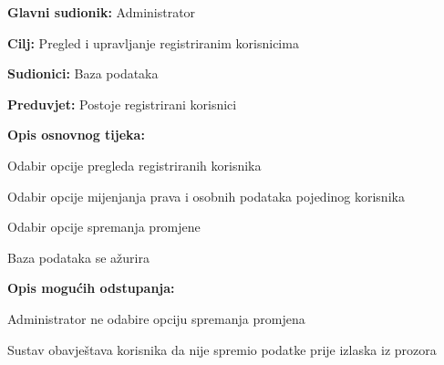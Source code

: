 					\noindent {}
					\begin{packed_item}
						
						\item \textbf{Glavni sudionik: }Administrator
						\item  \textbf{Cilj:} Pregled i upravljanje registriranim korisnicima
						\item  \textbf{Sudionici:} Baza podataka
						\item  \textbf{Preduvjet:} Postoje registrirani korisnici
						\item  \textbf{Opis osnovnog tijeka:}
						
						\item[] \begin{packed_enum}
							
							\item Odabir opcije pregleda registriranih korisnika
							\item Odabir opcije mijenjanja prava i osobnih podataka pojedinog korisnika
							\item Odabir opcije spremanja promjene
							\item Baza podataka se ažurira
							
						\end{packed_enum}
						
						\item  \textbf{Opis mogućih odstupanja:}
						
						\item[] \begin{packed_item}
							
							\item[3.a] Administrator ne odabire opciju spremanja promjena
							\item[] \begin{packed_enum}
								
								\item Sustav obavještava korisnika da nije spremio podatke prije izlaska iz prozora
								
							\end{packed_enum}
							
						\end{packed_item}
						
					\end{packed_item}
					
